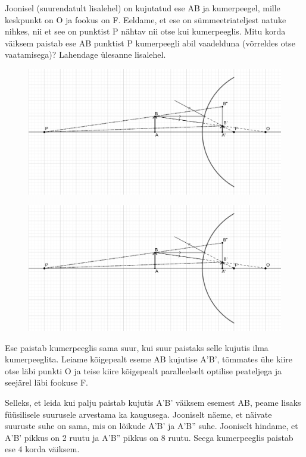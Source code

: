 
Joonisel (suurendatult lisalehel) on kujutatud ese AB ja kumerpeegel, mille keskpunkt on O ja fookus on F. Eeldame, et ese on sümmeetriateljest natuke nihkes, nii et see on punktist P nähtav nii otse kui kumerpeeglis. Mitu korda väiksem paistab ese AB punktist P kumerpeegli abil vaadelduna (võrreldes otse vaatamisega)? Lahendage ülesanne lisalehel.

\begin{figure}[h]
    \centering

    \includegraphics[width=0.75\linewidth]{2023-lahg-02-yl.png}
     \vspace{-20pt}
\end{figure}







\hint

\solu
\begin{figure}[h]
    \centering
    \includegraphics[width=\linewidth]{2023-lahg-02-yl.png}
\end{figure}

Ese paistab kumerpeeglis sama suur, kui suur paistaks selle kujutis ilma kumerpeeglita. Leiame kõigepealt eseme AB kujutise A'B', tõmmates ühe kiire otse läbi punkti O ja teise kiire kõigepealt paralleelselt optilise peateljega ja seejärel läbi fookuse F.

Selleks, et leida kui palju paistab kujutis A'B' väiksem esemest AB, peame lisaks füüsilisele suurusele arvestama ka kaugusega. Jooniselt näeme, et näivate suuruste suhe on sama, mis on lõikude A'B' ja A'B'' suhe. Jooniselt hindame, et A'B' pikkus on 2 ruutu ja A'B'' pikkus on 8 ruutu. Seega kumerpeeglis paistab ese 4 korda väiksem.
\probend